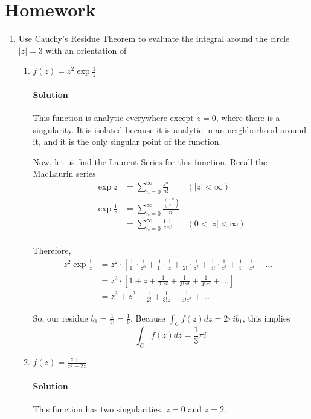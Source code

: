 \documentclass[11pt]{article}
\begin{document}
\section{Homework}
\begin{enumerate}
	\item Use Cauchy's Residue Theorem to evaluate the integral around the circle
	$|z| = 3$ with an orientation of
	\begin{enumerate}
		\item $f(z) = z^2\exp{\frac{1}{z}}$
		\paragraph{Solution}
		This function is analytic everywhere except $z = 0$, where there is a singularity. It is isolated because it is analytic in an neighborhood around it, and it is the only singular point of the function.
		
		\bigskip
		
		Now, let us find the Laurent Series for this function. Recall the MacLaurin series
		\[\begin{aligned}
		\exp{z} &= \sum^{\infty}_{n=0} \frac{z^n}{n!} & (|z| < \infty) \\
		\exp{\frac{1}{z}}
		&= \sum^{\infty}_{n=0} \frac{(\frac{1}{z}^n)}{n!} \\
		&= \sum^{\infty}_{n=0} \frac{1}{z}\frac{1}{n!} & (0 < |z| < \infty) \\
		\end{aligned}\]
		
		Therefore,
		\[\begin{aligned}
		z^2\exp{\frac{1}{z}}
		&= z^2 \cdot [
			\frac{1}{1!} \cdot \frac{1}{z^0} + 
			\frac{1}{1!} \cdot \frac{1}{z} + 
			\frac{1}{2!} \cdot \frac{1}{z^2} + 
			\frac{1}{3!} \cdot \frac{1}{z^3} +
			\frac{1}{4!} \cdot \frac{1}{z^4} + ...] \\
		&= z^2 \cdot [1 + z + \frac{1}{2!z^2} +
			\frac{1}{3!z^3} + \frac{1}{4!z^4} + ...] \\
		&= z^3 + z^2 + \frac{1}{2!} + \frac{1}{3!z} +
			\frac{1}{4!z^2} + ...
		\end{aligned}\]
		
		So, our residue $b_1 = \frac{1}{3!} = \frac{1}{6}$. Because
		$\int_C f(z) dz = 2\pi i b_1$, this implies
		\[\int_C f(z) dz = \frac{1}{3} \pi i \]
		
		\item $f(z) = \frac{z+1}{z^2 - 2z}$
		
		\paragraph{Solution}
		This function has two singularities, $z = 0$ and $z = 2$.
		

\end{enumerate}
\end{enumerate}
\end{document}
